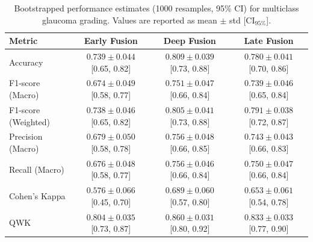 \documentclass[preprint,12pt]{elsarticle}
\begin{document}
\begin{table}[!t]
    \centering
    \caption{Bootstrapped performance estimates (1000 resamples, 95\% CI) for multiclass glaucoma grading. Values are reported as mean $\pm$ std [CI$_{95\%}$].}
    \label{tab:multiclass_bootstrap_ci}
    \scriptsize
    \setlength{\tabcolsep}{6pt}
    \begin{tabular}{|l|c|c|c|}
        \hline
        \textbf{Metric}                & \textbf{Early Fusion} & \textbf{Deep Fusion} & \textbf{Late Fusion} \\
        \hline
        Accuracy                       &
        $0.739 \pm 0.044$ [0.65, 0.82] &
        $0.809 \pm 0.039$ [0.73, 0.88] &
        $0.780 \pm 0.041$ [0.70, 0.86]                                                                       \\
        \hline
        F1-score (Macro)               &
        $0.674 \pm 0.049$ [0.58, 0.77] &
        $0.751 \pm 0.047$ [0.66, 0.84] &
        $0.739 \pm 0.046$ [0.65, 0.84]                                                                       \\
        \hline
        F1-score (Weighted)            &
        $0.738 \pm 0.046$ [0.65, 0.82] &
        $0.805 \pm 0.041$ [0.73, 0.88] &
        $0.791 \pm 0.038$ [0.72, 0.87]                                                                       \\
        \hline
        Precision (Macro)              &
        $0.679 \pm 0.050$ [0.58, 0.78] &
        $0.756 \pm 0.048$ [0.66, 0.85] &
        $0.743 \pm 0.043$ [0.66, 0.83]                                                                       \\
        \hline
        Recall (Macro)                 &
        $0.676 \pm 0.048$ [0.58, 0.77] &
        $0.756 \pm 0.046$ [0.66, 0.84] &
        $0.750 \pm 0.047$ [0.66, 0.84]                                                                       \\
        \hline
        Cohen’s Kappa                  &
        $0.576 \pm 0.066$ [0.45, 0.70] &
        $0.689 \pm 0.060$ [0.57, 0.80] &
        $0.653 \pm 0.061$ [0.54, 0.78]                                                                       \\
        \hline
        QWK                            &
        $0.804 \pm 0.035$ [0.73, 0.87] &
        $0.860 \pm 0.031$ [0.80, 0.92] &
        $0.833 \pm 0.033$ [0.77, 0.90]                                                                       \\
        \hline

\end{tabular}
\end{table}
\end{document}
